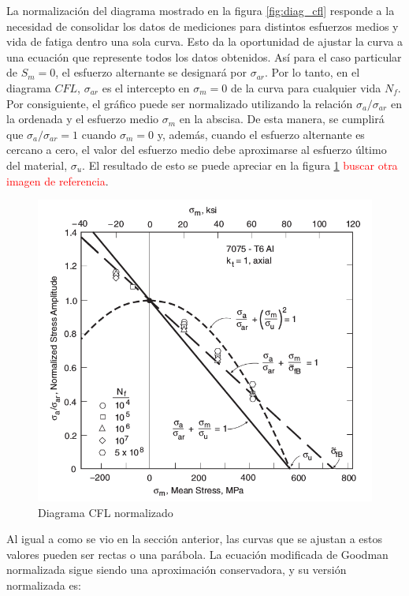 La normalización del diagrama mostrado en la figura \ref{fig:diag_cfl} responde a la necesidad de consolidar los datos de mediciones para distintos esfuerzos medios y vida de fatiga dentro una sola curva. Esto da la oportunidad de ajustar la curva a una ecuación que represente todos los datos obtenidos. Así para el caso particular de $S_m=0$, el esfuerzo alternante se designará por $\sigma_{ar}$. Por lo tanto, en el diagrama $CFL$, $\sigma_{ar}$ es el intercepto en $\sigma_m=0$ de la curva para cualquier vida $N_f$. Por consiguiente, el gráfico puede ser normalizado utilizando la relación $\sigma_a/\sigma_{ar}$ en la ordenada y el esfuerzo medio $\sigma_m$ en la abscisa. De esta manera, se cumplirá que $\sigma_a/\sigma_{ar}=1$ cuando $\sigma_m=0$ y, además, cuando el esfuerzo alternante es cercano a cero, el valor del esfuerzo medio debe aproximarse al esfuerzo último del material, $\sigma_u$. El resultado de esto se puede apreciar en la figura \ref{fig:cfl_norm} \textcolor{red}{buscar otra imagen de referencia}.

\begin{figure}[h]
\centering
\includegraphics[width=\textwidth]{Imagenes/cfl_norm.png}
\caption{Diagrama CFL normalizado}
\label{fig:cfl_norm}
\end{figure}

Al igual a como se vio en la sección anterior, las curvas que se ajustan a estos valores pueden ser rectas o una parábola. La ecuación modificada de Goodman normalizada sigue siendo una aproximación conservadora, y su versión normalizada es:

